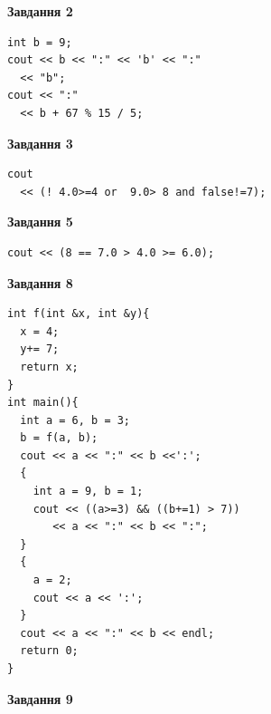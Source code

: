 \documentclass[12pt, ukrainian]{article}
\begin{document}
{\begin {large}
\begin{minipage}[t]{7.0cm}
\end{minipage}
\vline \hspace{1mm}
\begin{minipage}[t]{11.0cm}

\begin{center}
\textbf{Завдання 2}
\end{center}
\vspace{-8mm}

\begin{verbatim}
int b = 9;
cout << b << ":" << 'b' << ":" 
  << "b";
cout << ":" 
  << b + 67 % 15 / 5;
\end{verbatim}



\begin{center}
\textbf{Завдання 3}
\end{center}
\vspace{-8mm}

\begin{verbatim}
cout 
  << (! 4.0>=4 or  9.0> 8 and false!=7);
\end{verbatim}



\begin{center}
\textbf{Завдання 5}
\end{center}
\vspace{-8mm}

\begin{verbatim}
cout << (8 == 7.0 > 4.0 >= 6.0);
\end{verbatim}



\begin{center}
\textbf{Завдання 8}
\end{center}
\vspace{-8mm}

\begin{verbatim}
int f(int &x, int &y){
  x = 4;
  y+= 7;
  return x;
}
int main(){
  int a = 6, b = 3;
  b = f(a, b);
  cout << a << ":" << b <<':';
  {
    int a = 9, b = 1;
    cout << ((a>=3) && ((b+=1) > 7))
       << a << ":" << b << ":";
  }
  {
    a = 2;
    cout << a << ':';
  }
  cout << a << ":" << b << endl;
  return 0;
}
\end{verbatim}

\end{minipage}


\begin{minipage}[t]{7.0cm}

\begin{center}
\textbf{Завдання 9}
\end{center}
\vspace{-8mm}


\end{minipage}
\end{large}}
\end{document}
